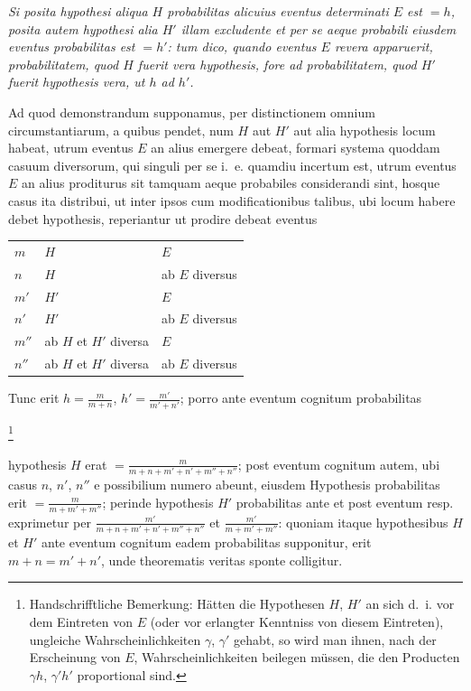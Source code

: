 \documentclass[11pt,a4paper]{article}
\begin{document}
\emph{Si posita hypothesi aliqua $H$ probabilitas alicuius eventus determinati $E$ est $= h$, posita autem hypothesi alia $H'$ illam excludente et per se aeque probabili eiusdem eventus probabilitas est $= h'$: tum dico, quando eventus $E$ revera apparuerit, probabilitatem, quod $H$ fuerit vera hypothesis, fore ad probabilitatem, quod $H'$ fuerit hypothesis vera, ut $h$ ad $h'$.}

Ad quod demonstrandum supponamus, per distinctionem omnium circumstantiarum, a quibus pendet, num $H$ aut $H'$ aut alia hypothesis locum habeat, utrum eventus $E$ an alius emergere debeat, formari systema quoddam casuum diversorum, qui singuli per se i.~e. quamdiu incertum est, utrum eventus $E$ an alius proditurus sit tamquam aeque probabiles considerandi sint, hosque casus ita distribui, ut inter ipsos cum modificationibus talibus, ubi locum habere debet hypothesis, reperiantur ut prodire debeat eventus
\begin{center}
\begin{tabular}{lll}
$m$ & $H$ & $E$ \\
$n$ & $H$ & ab $E$ diversus \\
$m'$ & $H'$ & $E$ \\
$n'$ & $H'$ & ab $E$ diversus \\
$m''$ & ab $H$ et $H'$ diversa & $E$ \\
$n''$ & ab $H$ et $H'$ diversa & ab $E$ diversus
\end{tabular}
\end{center}

Tunc erit $h = \frac{m}{m+n}$, $h' = \frac{m'}{m'+n'}$; porro ante eventum cognitum probabilitas

\footnote{\foreignlanguage{ngerman}{Handschrifftliche Bemerkung:} Hätten die Hypothesen $H$, $H'$ an sich d.~i. vor dem Eintreten von $E$ (oder vor erlangter Kenntniss von diesem Eintreten), ungleiche Wahrscheinlichkeiten $\gamma$, $\gamma'$ gehabt, so wird man ihnen, nach der Erscheinung von $E$, Wahrscheinlichkeiten beilegen müssen, die den Producten $\gamma h$, $\gamma' h'$ proportional sind.}

hypothesis $H$ erat $= \frac{m}{m+n+m'+n'+m''+n''}$; post eventum cognitum autem, ubi casus $n$, $n'$, $n''$ e possibilium numero abeunt, eiusdem Hypothesis probabilitas erit $= \frac{m}{m+m'+m''}$; perinde hypothesis $H'$ probabilitas ante et post eventum resp. exprimetur per $\frac{m'}{m+n+m'+n'+m''+n''}$ et $\frac{m'}{m+m'+m''}$: quoniam itaque hypothesibus $H$ et $H'$ ante eventum cognitum eadem probabilitas supponitur, erit $m+n = m'+n'$, unde theorematis veritas sponte colligitur.
\end{document}
